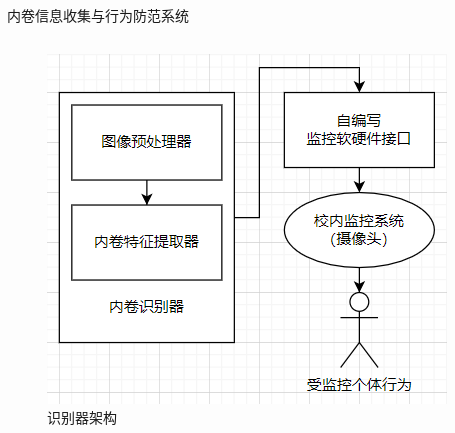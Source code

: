     \begin{frame}{内卷信息收集与行为防范系统}
        \begin{columns}
            \begin{figure}
                \centering
                \includegraphics[width=\textwidth]{contents/figure/data-detector.png}
                \caption{识别器架构}
                \label{fig:data-detector-2}
            \end{figure}


\end{columns}
\end{frame}
